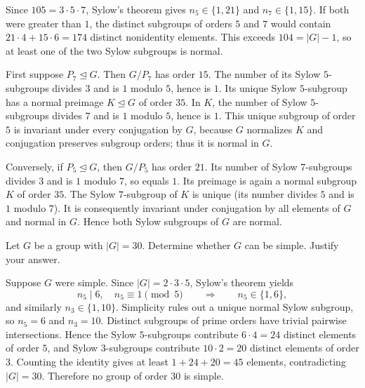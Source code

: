 \documentclass[11pt,oneside]{article}
\begin{document}
\begin{solution}
Since $105=3\cdot5\cdot7$, Sylow's theorem gives $n_5\in\{1,21\}$ and $n_7\in\{1,15\}$. If both were greater than $1$, the distinct subgroups of orders $5$ and $7$ would contain $21\cdot4+15\cdot6=174$ distinct nonidentity elements. This exceeds $104=|G|-1$, so at least one of the two Sylow subgroups is normal.

First suppose $P_7\trianglelefteq G$. Then $G/P_7$ has order $15$. The number of its Sylow $5$-subgroups divides $3$ and is $1$ modulo $5$, hence is $1$. Its unique Sylow $5$-subgroup has a normal preimage $K\trianglelefteq G$ of order $35$. In $K$, the number of Sylow $5$-subgroups divides $7$ and is $1$ modulo $5$, hence is $1$. This unique subgroup of order $5$ is invariant under every conjugation by $G$, because $G$ normalizes $K$ and conjugation preserves subgroup orders; thus it is normal in $G$.

Conversely, if $P_5\trianglelefteq G$, then $G/P_5$ has order $21$. Its number of Sylow $7$-subgroups divides $3$ and is $1$ modulo $7$, so equals $1$. Its preimage is again a normal subgroup $K$ of order $35$. The Sylow $7$-subgroup of $K$ is unique (its number divides $5$ and is $1$ modulo $7$). It is consequently invariant under conjugation by all elements of $G$ and normal in $G$. Hence both Sylow subgroups of $G$ are normal.
\end{solution}

\begin{supplementaryexercise}
Let $G$ be a group with $|G|=30$. Determine whether $G$ can be simple. Justify your answer.
\end{supplementaryexercise}

\begin{solution}
Suppose $G$ were simple. Since $|G|=2\cdot3\cdot5$, Sylow's theorem yields
\[
 n_5\mid6,\quad n_5\equiv1\pmod5
 \qquad\Longrightarrow\qquad n_5\in\{1,6\},
\]
and similarly $n_3\in\{1,10\}$. Simplicity rules out a unique normal Sylow subgroup, so $n_5=6$ and $n_3=10$. Distinct subgroups of prime orders have trivial pairwise intersections. Hence the Sylow $5$-subgroups contribute $6\cdot4=24$ distinct elements of order $5$, and Sylow $3$-subgroups contribute $10\cdot2=20$ distinct elements of order $3$. Counting the identity gives at least $1+24+20=45$ elements, contradicting $|G|=30$. Therefore no group of order $30$ is simple.
\end{solution}
\end{document}
